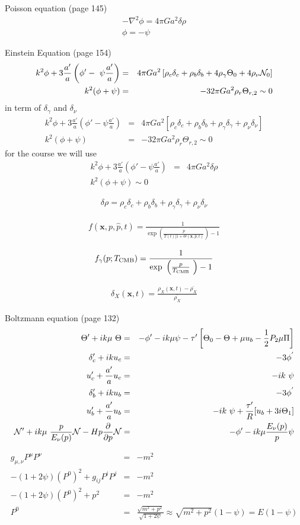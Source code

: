\documentclass[a4paper, 11pt]{article}
\def\ba{\begin{eqnarray}}
\def\ea{\end{eqnarray}}
\begin{document}
Poisson equation (page 145)
\ba
-\nabla^{2} \phi = 4\pi G a^{2} \delta \rho \\
\phi = - \psi
\ea

Einstein Equation (page 154)
\ba
k^{2}\phi + 3 \frac{a'}{a}\left( \phi' - \psi \frac{a'}{a} \right) &=& 4\pi G a^{2} \left[ \rho_{c}\delta_{c} + \rho_{b}\delta_{b} + 4 \rho_{\gamma} \Theta_{0} + 4 \rho_{\nu} {\cal N}_{0}  \right] \\
k^{2} (\phi + \psi) &=& - 32 \pi G a^{2} \rho_{r} \Theta_{r,2} \sim 0
\ea
in term of $\delta_{\gamma}$ and $\delta_{\nu}$
\ba
k^{2}\phi + 3 \frac{a'}{a}\left( \phi' - \psi \frac{a'}{a} \right) &=& 4\pi G a^{2} \left[ \rho_{c}\delta_{c} + \rho_{b}\delta_{b} + \rho_{\gamma} \delta_{\gamma} +  \rho_{\nu} \delta_{\nu} \right] \\
k^{2} (\phi + \psi) &=& - 32 \pi G a^{2} \rho_{r} \Theta_{r,2} \sim 0
\ea
for the course we will use
\ba
k^{2}\phi + 3 \frac{a'}{a}\left( \phi' - \psi \frac{a'}{a} \right) &=& 4\pi G a^{2} \delta \rho \\
k^{2} (\phi + \psi) \sim 0
\ea

\ba
\delta \rho =  \rho_{c}\delta_{c} + \rho_{b}\delta_{b} + \rho_{\gamma} \delta_{\gamma} +  \rho_{\nu} \delta_{\nu} 
\ea



\ba
f(\bm{x}, p, \hat{p}, t) = \frac{1}{\exp \left(\frac{p}{T(t)[1 + \Theta( \bm{x},  \hat{p}, t) } \right)-1 }
\ea

\ba
f_{\gamma}(p ; T_{\rm CMB}) = \frac{1}{\exp \left(\frac{p}{T_{\rm CMB}} \right)-1 }
\ea


\ba
\delta_{X}(\bm{x},t) = \frac{\rho_{X}(\bm{x},t) - \bar{\rho_{X}}}{ \bar{\rho_{X}}}
\ea

Boltzmann equation (page 132)
\ba
\Theta' + ik \mu \Theta &=& - \phi' - ik\mu\psi - \tau' \left[\Theta_{0} - \Theta + \mu u_{b} - \frac{1}{2} P_{2}{\mu} \Pi \right] \\
\delta'_{c} +iku_{c} &=& - 3\phi^{'} \\
u'_{c} + \frac{a'}{a} u_{c} &=& -ik \psi \\
\delta'_{b} +iku_{b} &=& - 3\phi^{'} \\
u'_{b} + \frac{a'}{a} u_{b} &=& -ik \psi + \frac{\tau'}{R}[u_{b} + 3i\Theta_{1}] \\
{\cal N}' + ik \mu \frac{p}{E_{\nu}(p)}{\cal N} -H p \frac{\partial}{\partial p} {\cal N} &=& - \phi' - ik \mu \frac{E_{\nu}(p)}{p} \psi \\
\ea

\ba
g_{\mu, \nu} P^{\mu} P^{\nu} &=& - m^{2} \\
-(1+2\psi) (P^{0})^{2} + g_{ij}P^{i}P^{j} &=& -m^{2} \\
-(1+2\psi) (P^{0})^{2} + p^{2} &=& -m^{2} \\
P^{0} &=& \frac{\sqrt{m^{2} + p^{2}}}{\sqrt{1+2\psi}} \approx  \sqrt{m^{2} + p^{2}}(1-\psi) = E(1-\psi)
\ea
\end{document}
